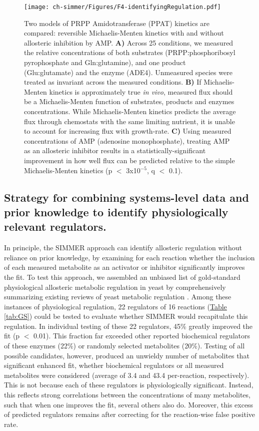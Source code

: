 \begin{figure}[h!]
\texttt{[image: ch-simmer/Figures/F4-identifyingRegulation.pdf]}
\caption[Two models of PRPP Amidotransferase (PPAT) kinetics are compared: reversible Michaelis-Menten kinetics with and without allosteric inhibition by AMP]{Two models of PRPP Amidotransferase (PPAT) kinetics are compared: reversible Michaelis-Menten kinetics with and without allosteric inhibition by AMP.  \textbf{A)} Across 25 conditions, we measured the relative concentrations of both substrates (PRPP:phosphoribosyl pyrophosphate and Gln:glutamine), and one product (Glu:glutamate) and the enzyme (ADE4). Unmeasured species were treated as invariant across the measured conditions. \textbf{B)} If Michaelis-Menten kinetics is approximately true \textit{in vivo}, measured flux should be a Michaelis-Menten function of substrates, products and enzymes concentrations.  While Michaelis-Menten kinetics predicts the average flux through chemostats with the same limiting nutrient, it is unable to account for increasing flux with growth-rate.  \textbf{C)} Using measured concentrations of AMP (adenosine monophosphate), treating AMP as an allosteric inhibitor results in a statistically-significant improvement in how well flux can be predicted relative to the simple Michaelis-Menten kinetics (p $<$ 3x10$^{-5}$, q $<$ 0.1).}
\label{fig:PPAT}
\end{figure}

\subsection{Strategy for combining systems-level data and prior knowledge to identify physiologically relevant regulators.}

In principle, the SIMMER approach can identify allosteric regulation without reliance on prior knowledge, by examining for each reaction whether the inclusion of each measured metabolite as an activator or inhibitor significantly improves the fit. To test this approach, we assembled an unbiased list of gold-standard physiological allosteric metabolic regulation in yeast by comprehensively summarizing existing reviews of yeast metabolic regulation \cite{Jones:1982dn, Sekine:2007ej, Fraenkel:2011wp}. Among these instances of physiological regulation, 22 regulators of 16 reactions (\hyperref[tab:GS]{Table \ref{tab:GS}}) could be tested to evaluate whether SIMMER would recapitulate this regulation. In individual testing of these 22 regulators, 45\% greatly improved the fit (p $<$ 0.01). This fraction far exceeded other reported biochemical regulators of these enzymes (22\%) or randomly selected metabolites (20\%). Testing of all possible candidates, however, produced an unwieldy number of metabolites that significant enhanced fit, whether biochemical regulators or all measured metabolites were considered (average of 3.4 and 43.4 per-reaction, respectively). This is not because each of these regulators is physiologically significant. Instead, this reflects strong correlations between the concentrations of many metabolites, such that when one improves the fit, several others also do. Moreover, this excess of predicted regulators remains after correcting for the reaction-wise false positive rate.

